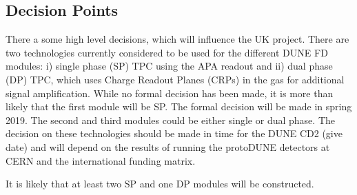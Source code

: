 \subsection{Decision Points}

There a some high level decisions, which will influence the UK project. There are two technologies currently considered to be used for the different DUNE FD modules: i) single phase (SP) TPC using the APA readout and ii) dual phase (DP) TPC, which uses Charge Readout Planes (CRPs) in the gas for additional signal amplification. While no formal decision has been made, it is more than likely that the first module will be SP. The formal decision will be made in spring 2019. The second and third modules could be either single or dual phase. The decision on these technologies should be made in time for the DUNE CD2 ({\color{red}give date}) and will depend on the results of running the protoDUNE detectors at CERN and the international funding matrix.

It is likely that at least two SP and one DP modules will be constructed.

